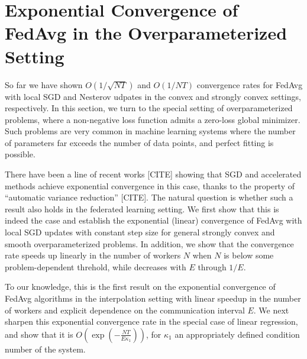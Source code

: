 


\section{Exponential Convergence of FedAvg in the Overparameterized Setting}

So far we have shown $O(1/\sqrt{NT})$ and $O(1/NT)$ convergence
rates for FedAvg with local SGD and Nesterov udpates in the convex
and strongly convex settings, respectively. In this section, we turn
to the special setting of overparameterized problems, where a non-negative
loss function admits a zero-loss global minimizer. Such problems are
very common in machine learning systems where the number of parameters
far exceeds the number of data points, and perfect fitting is possible. 

There have been a line of recent works {[}CITE{\cite{ma2017power}]} showing that SGD
and accelerated methods achieve exponential convergence in this case,
thanks to the property of ``automatic variance reduction'' {[}CITE{]}.
The natural question is whether such a result also holds in the federated
learning setting. We first show that this is indeed the case and establish
the exponential (linear) convergence of FedAvg with local SGD updates
with constant step size for general strongly convex and smooth overparameterized
problems. In addition, we show that the convergence rate speeds up
linearly in the number of workers $N$ when $N$ is below some problem-dependent
threhold, while decreases with $E$ through $1/E$. 

To our knowledge, this is the first result on the exponential convergence
of FedAvg algorithms in the interpolation setting with linear speedup
in the number of workers and explicit dependence on the communication
interval $E$. We next sharpen this exponential convergence rate in
the special case of linear regression, and show that it is $O(\exp(-\frac{NT}{E\kappa_{1}}))$,
for $\kappa_{1}$ an appropriately defined condition number of the
system. 

